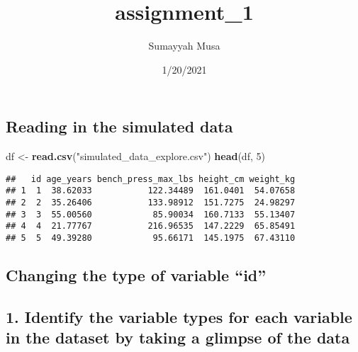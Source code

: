 \documentclass[
]{article}
\title{assignment\_1}
\author{Sumayyah Musa}
\date{1/20/2021}
\newenvironment{Shaded}{\begin{snugshade}}{\end{snugshade}}
\newcommand{\DecValTok}[1]{\textcolor[rgb]{0.00,0.00,0.81}{#1}}
\newcommand{\KeywordTok}[1]{\textcolor[rgb]{0.13,0.29,0.53}{\textbf{#1}}}
\newcommand{\NormalTok}[1]{#1}
\newcommand{\OperatorTok}[1]{\textcolor[rgb]{0.81,0.36,0.00}{\textbf{#1}}}
\newcommand{\StringTok}[1]{\textcolor[rgb]{0.31,0.60,0.02}{#1}}
\begin{document}
\maketitle

\hypertarget{reading-in-the-simulated-data}{%
\subsection{Reading in the simulated
data}\label{reading-in-the-simulated-data}}

\begin{Shaded}
\begin{Highlighting}[]
\NormalTok{df <-}\StringTok{ }\KeywordTok{read.csv}\NormalTok{(}\StringTok{"simulated_data_explore.csv"}\NormalTok{)}
\KeywordTok{head}\NormalTok{(df, }\DecValTok{5}\NormalTok{)}
\end{Highlighting}
\end{Shaded}

\begin{verbatim}
##   id age_years bench_press_max_lbs height_cm weight_kg
## 1  1  38.62033           122.34489  161.0401  54.07658
## 2  2  35.26406           133.98912  151.7275  24.98297
## 3  3  55.00560            85.90034  160.7133  55.13407
## 4  4  21.77767           216.96535  147.2229  65.85491
## 5  5  49.39280            95.66171  145.1975  67.43110
\end{verbatim}

\hypertarget{changing-the-type-of-variable-id}{%
\subsection{Changing the type of variable
``id''}\label{changing-the-type-of-variable-id}}

\begin{Shaded}
\end{Shaded}

\hypertarget{identify-the-variable-types-for-each-variable-in-the-dataset-by-taking-a-glimpse-of-the-data}{%
\subsection{1. Identify the variable types for each variable in the
dataset by taking a glimpse of the
data}\label{identify-the-variable-types-for-each-variable-in-the-dataset-by-taking-a-glimpse-of-the-data}}
\end{document}
